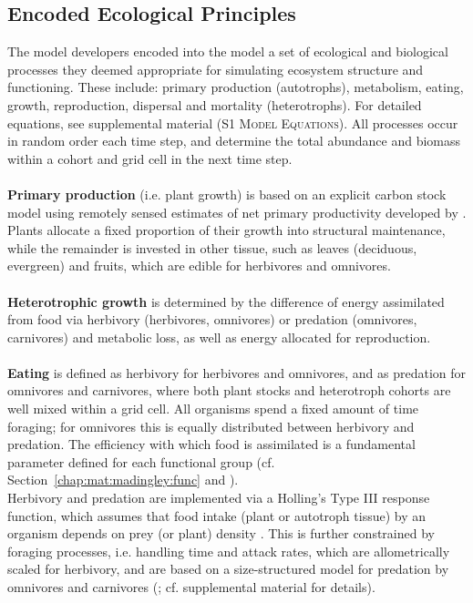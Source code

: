 \subsection{Encoded Ecological Principles}
\label{chap:mat:madingley:princip}
The model developers encoded into the model a set of ecological and biological processes they deemed appropriate for simulating ecosystem structure and functioning. These include: primary production (autotrophs), metabolism, eating, growth, reproduction, dispersal and mortality (heterotrophs). For detailed equations, see supplemental material (S1 \textsc{Model Equations}). All processes occur in random order each time step, and determine the total abundance and biomass within a cohort and grid cell in the next time step. \\\\
\textbf{Primary production} (i.e. plant growth) is based on an explicit carbon stock model using remotely sensed estimates of net primary productivity developed by \cite{Smith2012}. 
Plants allocate a fixed proportion of their growth into structural maintenance, while the remainder is invested in other tissue, such as leaves (deciduous, evergreen) and fruits, which are edible for herbivores and omnivores. 
\\\\
\textbf{Heterotrophic growth} is determined by the difference of energy assimilated from food via herbivory (herbivores, omnivores) or predation (omnivores, carnivores) and metabolic loss, as well as energy allocated for reproduction.\\\\
\textbf{Eating} is defined as herbivory for herbivores and omnivores, and as predation for omnivores and carnivores, where both plant stocks and heterotroph cohorts are well mixed within a grid cell. All organisms spend a fixed amount of time foraging; for omnivores this is equally distributed between herbivory and predation. 
The efficiency with which food is assimilated is a fundamental parameter defined for each functional group (cf. Section~\ref{chap:mat:madingley:func} and ). \\
Herbivory and predation are implemented via a Holling's Type III response function, which assumes that food intake (plant or autotroph tissue) by an organism depends on prey (or plant) density \citep{Denno2012}. 
This is further constrained by foraging processes, i.e. handling time and attack rates, which are allometrically scaled for herbivory, and are based on a size-structured model for predation by omnivores and carnivores (\citet{Williams2011}; cf. supplemental material for details). 
